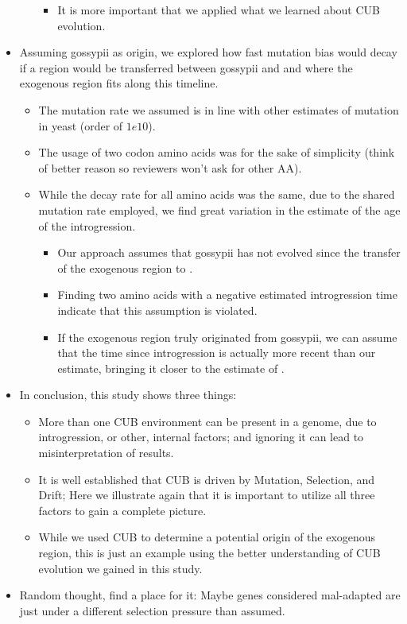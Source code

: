 \documentclass[12pt]{article}
\begin{document}
\begin{itemize}
\begin{itemize}
\begin{itemize}
			\item It is more important that we applied what we learned about CUB evolution.
		\end{itemize}
	\end{itemize}
	\item Assuming gossypii as origin, we explored how fast mutation bias would decay if a region would be transferred between gossypii and \kluyveri and where the exogenous region fits along this timeline.
	\begin{itemize}
		\item The mutation rate we assumed is in line with other estimates of mutation in yeast (order of $1e10$).
		\item The usage of two codon amino acids was for the sake of simplicity (think of better reason so reviewers won't ask for other AA). 
		\item While the decay rate for all amino acids was the same, due to the shared mutation rate employed, we find great variation in the estimate of the age of the introgression.
		\begin{itemize}
			\item Our approach assumes that gossypii has not evolved since the transfer of the exogenous region to \kluyveri.
			\item Finding two amino acids with a negative estimated introgression time indicate that this assumption is violated.
			\item If the exogenous region truly originated from gossypii, we can assume that the time since introgression is actually more recent than our estimate, bringing it closer to the estimate of \citep{friedrich2015}.
		\end{itemize}
	\end{itemize}	
	\item In conclusion, this study shows three things:
	\begin{itemize}
		\item More than one CUB environment can be present in a genome, due to introgression, or other, internal factors; and ignoring it can lead to misinterpretation of results.
		\item It is well established that CUB is driven by Mutation, Selection, and Drift; Here we illustrate again that it is important to utilize all three factors to gain a complete picture.
		\item While we used CUB to determine a potential origin of the exogenous region, this is just an example using the better understanding of CUB evolution we gained in this study.
	\end{itemize}
	\item Random thought, find a place for it: Maybe genes considered mal-adapted are just under a different selection pressure than assumed.
\end{itemize}
\end{document}
